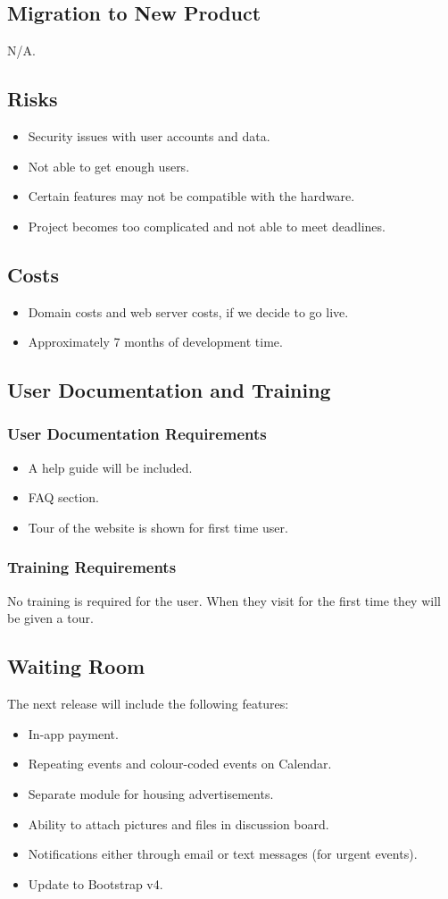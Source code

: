 \documentclass[12pt]{article}
\begin{document}
{\subsection{Migration to New Product}
N/A.

\subsection{Risks}
\begin{itemize}
  \item Security issues with user accounts and data.
  \item Not able to get enough users.
  \item Certain features may not be compatible with the hardware.
  \item Project becomes too complicated and not able to meet deadlines.
\end{itemize}
\subsection{Costs}
\begin{itemize}
  \item Domain costs and web server costs, if we decide to go live.
  \item Approximately 7 months of development time.
\end{itemize}
\subsection{User Documentation and Training}
\subsubsection{User Documentation Requirements}
\begin{itemize}
  \item A help guide will be included.
  \item FAQ section.
  \item Tour of the website is shown for first time user.
\end{itemize}
\subsubsection{Training Requirements}
No training is required for the user. When they visit for the first time they 
will be given a tour. 
\subsection{Waiting Room}
The next release will include the following features:
\begin{itemize}
	\item In-app payment.
	\item Repeating events and colour-coded events on Calendar.
	\item Separate module for housing advertisements.
	\item Ability to attach pictures and files in discussion board.
	\item Notifications either through email or text messages (for urgent events).
	\item Update to Bootstrap v4.
\end{itemize}
}
\end{document}
